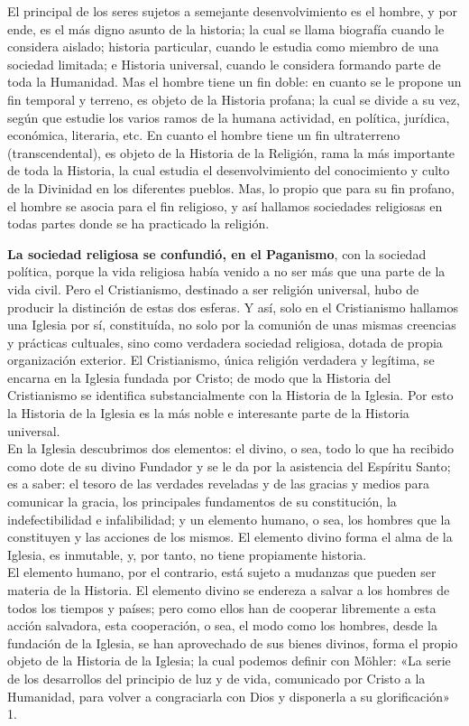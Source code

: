 \raggedbottom{} \documentclass[12pt, a4paper]{book}
\begin{document}
El principal de los seres sujetos a semejante desenvolvimiento es el hombre, y por ende, es el más digno asunto de la historia; la cual se llama biografía cuando le considera aislado; historia particular, cuando le estudia como miembro de una sociedad limitada; e Historia universal, cuando le considera formando parte de toda la Humanidad. Mas el hombre tiene un fin doble: en cuanto se le propone un fin temporal y terreno, es objeto de la Historia profana; la cual se divide a su vez, según que estudie los varios ramos de la humana actividad, en política, jurídica, económica, literaria, etc. En cuanto el hombre tiene un fin ultraterreno (transcendental), es objeto de la Historia de la Religión, rama la más importante de toda la Historia, la cual estudia el desenvolvimiento del conocimiento y culto de la Divinidad en los diferentes pueblos. Mas, lo propio que para su fin profano, el hombre se asocia para el fin religioso, y así hallamos sociedades religiosas en todas partes donde se ha practicado la religión.

\textbf{La sociedad religiosa se confundió, en el Paganismo}, con la sociedad política, porque la vida religiosa había venido a no ser más que una parte de la vida civil. Pero el Cristianismo, destinado a ser religión universal, hubo de producir la distinción de estas dos esferas. Y así, solo en el Cristianismo hallamos una Iglesia por sí, constituída, no solo por la comunión de unas mismas creencias y prácticas cultuales, sino como verdadera sociedad religiosa, dotada de propia organización exterior. El Cristianismo, única religión verdadera y legítima, se encarna en la Iglesia fundada por Cristo; de modo que la Historia del Cristianismo se identifica substancialmente con la Historia de la Iglesia. Por esto la Historia de la Iglesia es la más noble e interesante parte de la Historia universal.\\
En la Iglesia descubrimos dos elementos: el divino, o sea, todo lo que ha recibido como dote de su divino Fundador y se le da por la asistencia del Espíritu Santo; es a saber: el tesoro de las verdades reveladas y de las gracias y medios para comunicar la gracia, los principales fundamentos de su constitución, la indefectibilidad e infalibilidad; y un elemento humano, o sea, los hombres que la constituyen y las acciones de los mismos. El elemento divino forma el alma de la Iglesia, es inmutable, y, por tanto, no tiene propiamente historia.\\
El elemento humano, por el contrario, está sujeto a mudanzas que pueden ser materia de la Historia. El elemento divino se endereza a salvar a los hombres de todos los tiempos y países; pero como ellos han de cooperar libremente a esta acción salvadora, esta cooperación, o sea, el modo como los hombres, desde la fundación de la Iglesia, se han aprovechado de sus bienes divinos, forma el propio objeto de la Historia de la Iglesia; la cual podemos definir con Möhler: «La serie de los desarrollos del principio de luz y de vida, comunicado por Cristo a la Humanidad, para volver a congraciarla con Dios y disponerla a su glorificación» 1.
\end{document}
